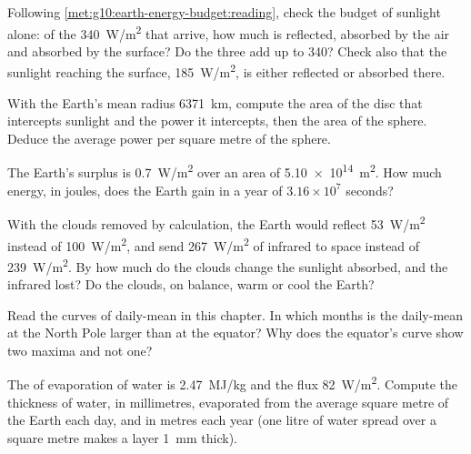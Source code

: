 \begin{exercise}[$\star\star$]\label{exo:g10:earth-energy-budget:7}
Following \cref{met:g10:earth-energy-budget:reading}, check the budget of
sunlight alone: of the \qty{340}{W/m^2} that arrive, how much is reflected,
absorbed by the air and absorbed by the surface? Do the three add up to 340?
Check also that the sunlight reaching the surface, \qty{185}{W/m^2}, is
either reflected or absorbed there.
\end{exercise}

\begin{exercise}[$\star\star$]\label{exo:g10:earth-energy-budget:8}
With the Earth's mean radius \qty{6371}{km}, compute the area of the disc
that intercepts sunlight and the power it intercepts, then the area of the
sphere. Deduce the average power per square metre of the sphere.
\end{exercise}

\begin{exercise}[$\star\star$]\label{exo:g10:earth-energy-budget:9}
The Earth's surplus is \qty{0.7}{W/m^2} over an area of
\qty{5.10e14}{m^2}. How much energy, in joules, does the Earth gain in a year
of $3.16\times10^7$ seconds?
\end{exercise}

\begin{exercise}[$\star\star$]\label{exo:g10:earth-energy-budget:10}
With the clouds removed by calculation, the Earth would reflect
\qty{53}{W/m^2} instead of \qty{100}{W/m^2}, and send \qty{267}{W/m^2} of
infrared to space instead of \qty{239}{W/m^2}. By how much do the clouds
change the sunlight absorbed, and the infrared lost? Do the clouds, on
balance, warm or cool the Earth?
\end{exercise}

\begin{exercise}[$\star\star$]\label{exo:g10:earth-energy-budget:11}
Read the curves of daily-mean  in this chapter. In which months is the
daily-mean  at the North Pole larger than at the equator? Why does
the equator's curve show two maxima and not one?
\end{exercise}

\begin{exercise}[$\star\star\star$]\label{exo:g10:earth-energy-budget:12}
The  of evaporation of water is \qty{2.47}{MJ/kg} and the  flux \qty{82}{W/m^2}. Compute the thickness of water, in millimetres,
evaporated from the average square metre of the Earth each day, and in metres
each year (one litre of water spread over a square metre makes a layer
\qty{1}{mm} thick).
\end{exercise}

